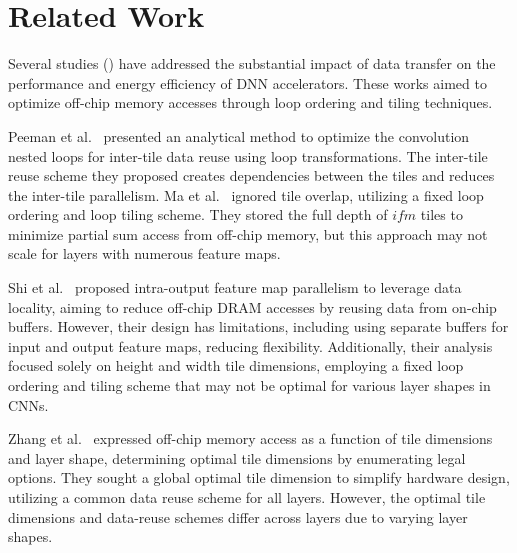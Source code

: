 \section{Related Work}
Several studies (\cite{Li2018SmartShuttleOO, zhang2015optimizing, 7092377, MaYufei, 7302332, 7428073, 6657019}) have addressed the substantial impact of data transfer on the performance and energy efficiency of DNN accelerators. These works aimed to optimize off-chip memory accesses through loop ordering and tiling techniques.

Peeman et al.~\cite{7092377} presented an analytical method to optimize the convolution nested loops for inter-tile data reuse using loop transformations. The inter-tile reuse scheme they proposed creates dependencies between the tiles and reduces the inter-tile parallelism. Ma et al.~\cite{MaYufei} ignored tile overlap, utilizing a fixed loop ordering and loop tiling scheme. They stored the full depth of $ifm$ tiles to minimize partial sum access from off-chip memory, but this approach may not scale for layers with numerous feature maps.
 
Shi et al.~\cite{7302332} proposed intra-output feature map parallelism to leverage data locality, aiming to reduce off-chip DRAM accesses by reusing data from on-chip buffers. However, their design has limitations, including using separate buffers for input and output feature maps, reducing flexibility. Additionally, their analysis focused solely on height and width tile dimensions, employing a fixed loop ordering and tiling scheme that may not be optimal for various layer shapes in CNNs. 

Zhang et al.~\cite{zhang2015optimizing} expressed off-chip memory access as a function of tile dimensions and layer shape, determining optimal tile dimensions by enumerating legal options. They sought a global optimal tile dimension to simplify hardware design, utilizing a common data reuse scheme for all layers. However, the optimal tile dimensions and data-reuse schemes differ across layers due to varying layer shapes.

